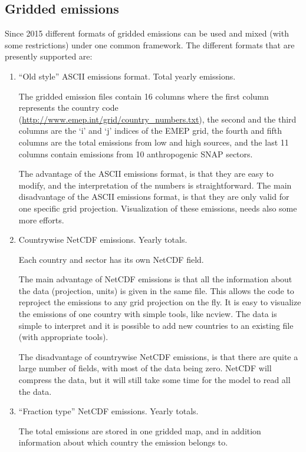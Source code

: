 \documentclass[a4paper,12pt]{report}
\begin{document}
\subsection{Gridded emissions}
\label{emisnew}

Since 2015 different formats of gridded emissions can be used and
mixed (with some restrictions) under one common framework. The
different formats that are presently supported are: 
\begin{enumerate}
\item ``Old style'' ASCII emissions format. Total yearly emissions.

The gridded emission files contain 16 columns where the first column 
represents the country code
(\url{http://www.emep.int/grid/country_numbers.txt}), 
the second and the third columns are the `i' and `j' indices of the
EMEP grid, the fourth and fifth columns are the total emissions from
low and high sources, and the last 11 columns contain emissions from 
10 anthropogenic SNAP sectors.

The advantage of the ASCII emissions format, is that they are easy to
modify, and the interpretation of the numbers is straightforward. 
The main disadvantage of the ASCII emissions format, is that they are
only valid for one specific grid projection. Visualization of these
emissions, needs also some more efforts. 

\item Countrywise NetCDF emissions. Yearly totals.

Each country and sector has its own NetCDF field.

The main advantage of NetCDF emissions is that all the information
about the data (projection, units) is given in the same file. This
allows the code to reproject the emissions to any grid projection on
the fly. It is easy to visualize the emissions of one country with
simple tools, like ncview. The data is simple to interpret and it is
possible to add new countries to an existing file (with appropriate
tools). 

The disadvantage of countrywise NetCDF emissions, is that there are
quite a large number of fields, with most of the data being
zero. NetCDF will compress the data, but it will still take some time
for the model to read all the data. 
 
\item ``Fraction type'' NetCDF emissions. Yearly totals.

The total emissions are stored in one gridded map, and in addition
information about which country the emission belongs to. 


\end{enumerate}
\end{document}
